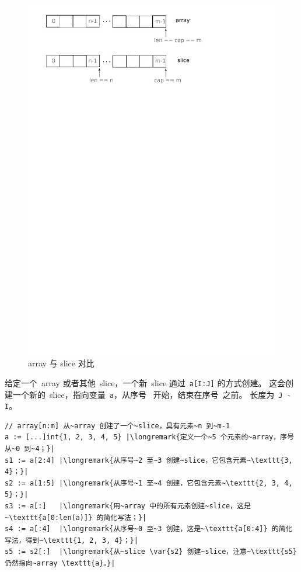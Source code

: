 \begin{figure}[H]
\caption{array 与 slice 对比}
\label{fig:array-vs-slice}
\begin{center}
\includegraphics[scale=0.65]{fig/array-vs-slice.pdf}
\end{center}
\end{figure}

给定一个~array 或者其他~slice，一个新~slice 通过~\lstinline{a[I:J]}
的方式创建。
这会创建一个新的~slice，指向变量~\lstinline{a}，从序号~ 开始，结束在序号~之前。
长度为~\lstinline{J - I}。

\begin{lstlisting}
// array[n:m] 从~array 创建了一个~slice，具有元素~n 到~m-1
a := [...]int{1, 2, 3, 4, 5} |\longremark{定义一个~5 个元素的~array，序号从~0 到~4；}|
s1 := a[2:4] |\longremark{从序号~2 至~3 创建~slice，它包含元素~\texttt{3, 4}；}|
s2 := a[1:5] |\longremark{从序号~1 至~4 创建，它包含元素~\texttt{2, 3, 4, 5}；}|
s3 := a[:]   |\longremark{用~array 中的所有元素创建~slice，这是~\texttt{a[0:len(a)]} 的简化写法；}|
s4 := a[:4]  |\longremark{从序号~0 至~3 创建，这是~\texttt{a[0:4]} 的简化写法，得到~\texttt{1, 2, 3, 4}；}|
s5 := s2[:]  |\longremark{从~slice \var{s2} 创建~slice，注意~\texttt{s5} 仍然指向~array \texttt{a}。}|
\end{lstlisting}
\showremarks

